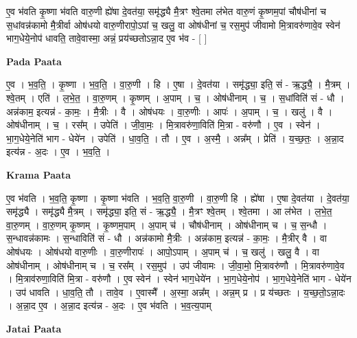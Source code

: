\documentclass[17pt]{extarticle}
\begin{document}
ए॒व भ॑वति कृ॒ष्णा भ॑वति वारु॒णी ह्ये॑षा दे॒वत॑या॒ समृ॑द्ध्यै मै॒त्रꣳ श्वे॒तमा ल॑भेत वारु॒णं कृ॒ष्णम॒पां चौष॑धीनां च स॒धांवन्न॑कामो मै॒त्रीर्वा ओष॑धयो वारु॒णीरापो॒ऽपां च॒ खलु॒ वा ओष॑धीनां च॒ रस॒मुप॑ जीवामो मि॒त्रावरु॑णावे॒व स्वेन॑ भाग॒धेये॒नोप॑ धावति॒ तावे॒वास्मा॒ अन्नं॒ प्रय॑च्छतोऽन्ना॒द ए॒व भ॑व - [  ] \newline

\textbf{Pada Paata} \newline

ए॒व । भ॒व॒ति॒ । कृ॒ष्णा । भ॒व॒ति॒ । वा॒रु॒णी । हि । ए॒षा । दे॒वत॑या । समृ॑द्ध्या॒ इति॒ सं - ऋ॒द्ध्यै॒ । मै॒त्रम् । श्वे॒तम् । एति॑ । ल॒भे॒त॒ । वा॒रु॒णम् । कृ॒ष्णम् । अ॒पाम् । च॒ । ओष॑धीनाम् । च॒ । स॒धांविति॑ सं - धौ । अन्न॑काम॒ इत्यन्न॑ - का॒मः॒ । मै॒त्रीः । वै । ओष॑धयः । वा॒रु॒णीः । आपः॑ । अ॒पाम् । च॒ । खलु॑ । वै । ओष॑धीनाम् । च॒ । रस᳚म् । उपेति॑ । जी॒वा॒मः॒ । मि॒त्रावरु॑णा॒विति॑ मि॒त्रा - वरु॑णौ । ए॒व । स्वेन॑ । भा॒ग॒धेये॒नेति॑ भाग - धेये॑न । उपेति॑ । धा॒व॒ति॒ । तौ । ए॒व । अ॒स्मै॒ । अन्न᳚म् । प्रेति॑ । य॒च्छ॒तः॒ । अ॒न्ना॒द इत्य॑न्न - अ॒दः । ए॒व । भ॒व॒ति॒ ।  \newline


\textbf{Krama Paata} \newline

ए॒व भ॑वति । भ॒व॒ति॒ कृ॒ष्णा । कृ॒ष्णा भ॑वति । भ॒व॒ति॒ वा॒रु॒णी । वा॒रु॒णी हि । ह्ये॑षा । ए॒षा दे॒वत॑या । दे॒वत॑या॒ समृ॑द्ध्यै । समृ॑द्ध्यै मै॒त्रम् । समृ॑द्ध्या॒ इति॒ सं - ऋ॒द्ध्यै॒ । मै॒त्रꣳ श्वे॒तम् । श्वे॒तमा । आ ल॑भेत । ल॒भे॒त॒ वा॒रु॒णम् । वा॒रु॒णम् कृ॒ष्णम् । कृ॒ष्णम॒पाम् । अ॒पाम् च॑ । चौष॑धीनाम् । ओष॑धीनाम् च । च॒ स॒न्धौ । स॒न्धावन्न॑कामः । स॒न्धाविति॑ सं - धौ । अन्न॑कामो मै॒त्रीः । अन्न॑काम॒ इत्यन्न॑ - का॒मः॒ । मै॒त्रीर् वै । वा ओष॑धयः । ओष॑धयो वारु॒णीः । वा॒रु॒णीरापः॑ । आपो॒ऽपाम् । अ॒पाम् च॑ । च॒ खलु॑ । खलु॒ वै । वा ओष॑धीनाम् । ओष॑धीनाम् च । च॒ रस᳚म् । रस॒मुप॑ । उप॑ जीवामः । जी॒वा॒मो॒ मि॒त्रावरु॑णौ । मि॒त्रावरु॑णावे॒व । मि॒त्राव॑रुणा॒विति॑ मि॒त्रा - वरु॑णौ । ए॒व स्वेन॑ । स्वेन॑ भाग॒धेये॑न । भा॒ग॒धेये॒नोप॑ । भा॒ग॒धेये॒नेति॑ भाग - धेये॑न । उप॑ धावति । धा॒व॒ति॒ तौ । तावे॒व । ए॒वास्मै᳚ । अ॒स्मा॒ अन्न᳚म् । अन्न॒म् प्र । प्र य॑च्छतः । य॒च्छ॒तो॒ऽन्ना॒दः । अ॒न्ना॒द ए॒व । अ॒न्ना॒द इत्य॑न्न - अ॒दः । ए॒व भ॑वति । भ॒व॒त्य॒पाम् \newline

\textbf{Jatai Paata} \newline
\end{document}
